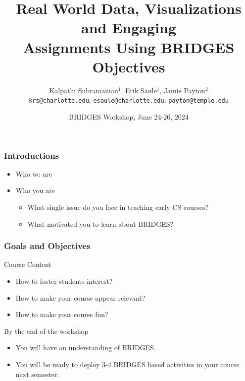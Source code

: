 \documentclass[aspectratio=169]{beamer}
\title[Objectives]{Real World Data, Visualizations and Engaging \\Assignments Using BRIDGES\vspace*{0.05in}\\Objectives}
\subtitle{}
\author{Kalpathi Subramanian$^1$, Erik Saule$^1$, Jamie Payton$^2$\\\texttt{krs@charlotte.edu}, \texttt{esaule@charlotte.edu}, \texttt{payton@temple.edu} }
\institute{$^1$The University of North Carolina at Charlotte\\$^2$Temple University}
\date{BRIDGES Workshop, June 24-26, 2024}
\begin{document}
\begin{frame}
\titlepage

\end{frame}


\begin{frame}
  \frametitle{Introductions}

  \begin{itemize}
  \item Who we are
  \item Who you are
	\begin{itemize}
		\item What single issue do you face in teaching early CS courses?
		\item What motivated you to learn about BRIDGES?
	\end{itemize}
  \end{itemize}
\end{frame}

\begin{frame}
  \frametitle{Goals and Objectives}


    
    \begin{block}{Course Content}
      \begin{itemize}
      \item How to foster students interest?
      \item How to make your course appear relevant?
      \item How to make your course fun?
      \end{itemize}
    \end{block}


  \begin{block}{By the end of the workshop}
    \begin{itemize}
    \item You will have an understanding of BRIDGES.
    \item You will be ready to deploy 3-4 BRIDGES based activities 
			in your course next semester.
    \end{itemize}
  \end{block}

  
\end{frame}
\end{document}
